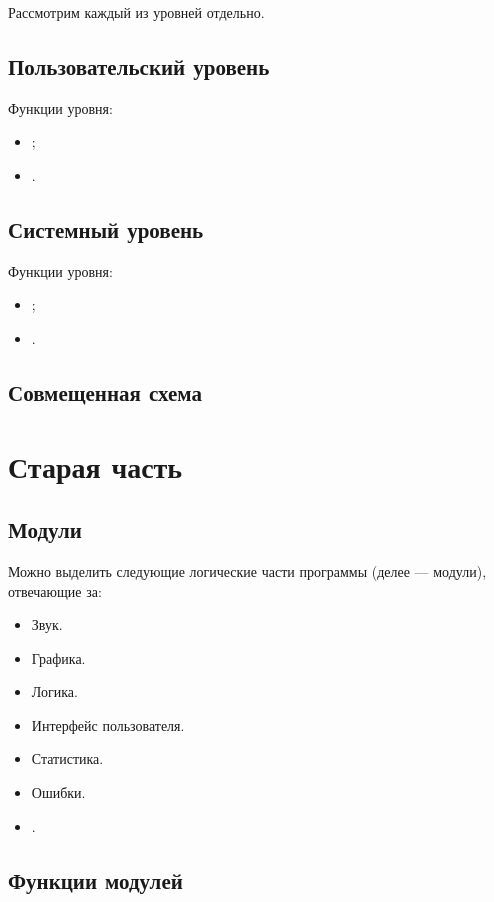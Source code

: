 \documentclass[12pt,a4paper,fullpage]{article}
\begin{document}
Рассмотрим каждый из уровней отдельно.

\subsection{Пользовательский уровень}

Функции уровня:
\begin{itemize}
	\item ;
	\item .
\end{itemize}

\subsection{Системный уровень}

Функции уровня:
\begin{itemize}
	\item ;
	\item .
\end{itemize}

\subsection{Совмещенная схема}

\newpage
\section{Старая часть}
\subsection{Модули}

Можно выделить следующие логические части программы (делее --- модули), отвечающие за:
\begin{itemize}
	\item Звук.
	\item Графика.
	\item Логика.
	\item Интерфейс пользователя.
	\item Статистика.
	\item Ошибки.
	\item .\\
\end{itemize}

\subsection{Функции модулей}
\end{document}
